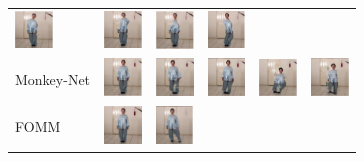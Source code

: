 \documentclass{article}
\begin{document}
\begin{table}[t]
\begin{center}
\begin{small}
\begin{sc}
\begin{tabular}{m{1.0cm}m{1.0cm}m{1.0cm}m{1.0cm}m{1.0cm}m{1.0cm}}
\includegraphics[width=1cm, height=1cm]{images/1_X2Face_2} &
\includegraphics[width=1cm, height=1cm]{images/1_X2Face_3} &
\includegraphics[width=1cm, height=1cm]{images/1_X2Face_4} &
\includegraphics[width=1cm, height=1cm]{images/1_X2Face_5} \\
Monkey-Net & \includegraphics[width=1cm, height=1cm]{images/2_Monkey-Net_1} &
\includegraphics[width=1cm, height=1cm]{images/2_Monkey-Net_2} &
\includegraphics[width=1cm, height=1cm]{images/2_Monkey-Net_3} &
\includegraphics[width=1cm, height=1cm]{images/2_Monkey-Net_4} &
\includegraphics[width=1cm, height=1cm]{images/2_Monkey-Net_5} \\
FOMM & \includegraphics[width=1cm, height=1cm]{images/3_FOMM_1} &
\includegraphics[width=1cm, height=1cm]{images/3_FOMM_2} &

\end{tabular}
\end{sc}
\end{small}
\end{center}
\end{table}
\end{document}
